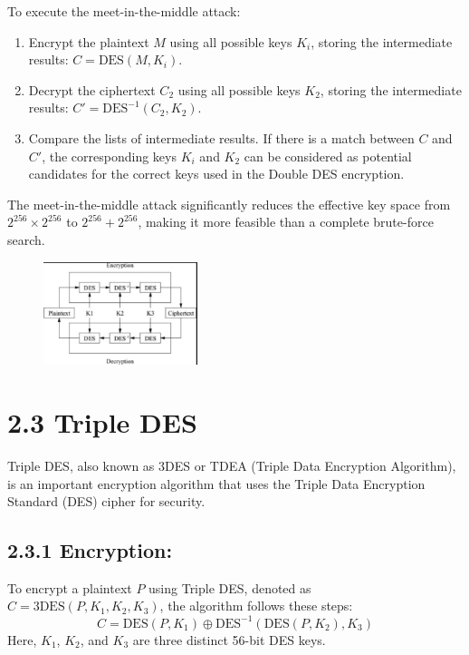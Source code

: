 \documentclass[11pt]{article}
\begin{document}
To execute the meet-in-the-middle attack:
\begin{enumerate}
    \item Encrypt the plaintext \(M\) using all possible keys \(K_i\), storing the intermediate results: \(C = \text{DES}(M, K_i)\).
    \item Decrypt the ciphertext \(C_2\) using all possible keys \(K_2\), storing the intermediate results: \(C' = \text{DES}^{-1}(C_2, K_2)\).
    \item Compare the lists of intermediate results. If there is a match between \(C\) and \(C'\), the corresponding keys \(K_i\) and \(K_2\) can be considered as potential candidates for the correct keys used in the Double DES encryption.
\end{enumerate}

The meet-in-the-middle attack significantly reduces the effective key space from \(2^{256} \times 2^{256}\) to \(2^{256} + 2^{256}\), making it more feasible than a complete brute-force search.




\begin{figure}
    \centering
    \includegraphics[width=0.4\textwidth]{img3.2.PNG} %
    \caption{} %
\end{figure}


\section*{2.3 Triple DES}

Triple DES, also known as 3DES or TDEA (Triple Data Encryption Algorithm), is an important encryption algorithm that uses the Triple Data Encryption Standard (DES) cipher for security.

\subsection*{2.3.1 Encryption:}
To encrypt a plaintext \(P\) using Triple DES, denoted as \(C = \text{3DES}(P, K_1, K_2, K_3)\), the algorithm follows these steps:
\[ C = \text{DES}(P, K_1) \oplus \text{DES}^{-1}(\text{DES}(P, K_2), K_3) \]
Here, \(K_1\), \(K_2\), and \(K_3\) are three distinct 56-bit DES keys.
\end{document}

